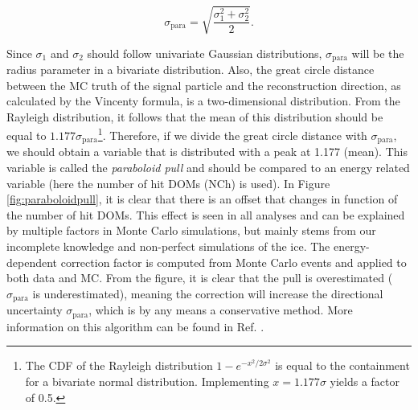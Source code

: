 \begin{equation}
\label{eq:paraboloid}
\sigma_\textrm{para} = \sqrt{\frac{\sigma_1^2 + \sigma_2^2}{2}}.
\end{equation}

\noindent Since $\sigma_1$ and $\sigma_2$ should follow univariate Gaussian distributions, $\sigma_\textrm{para}$ will be the radius parameter in a bivariate distribution. Also, the great circle distance between the MC truth of the signal particle and the reconstruction direction, as calculated by the Vincenty formula, is a two-dimensional distribution. From the Rayleigh distribution, it follows that the mean of this distribution should be equal to $1.177\sigma_\textrm{para}$\footnote{The CDF of the Rayleigh distribution $1-e^{-x^2/2\sigma^2}$ is equal to the containment for a bivariate normal distribution. Implementing $x=1.177\sigma$ yields a factor of 0.5.}. Therefore, if we divide the great circle distance with $\sigma_\textrm{para}$, we should obtain a variable that is distributed with a peak at 1.177 (mean). This variable is called the \textit{paraboloid pull} and should be compared to an energy related variable (here the number of hit DOMs (NCh) is used). In Figure \ref{fig:paraboloidpull}, it is clear that there is an offset that changes in function of the number of hit DOMs. This effect is seen in all analyses and can be explained by multiple factors in Monte Carlo simulations, but mainly stems from our incomplete knowledge and non-perfect simulations of the ice. The energy-dependent correction factor is computed from Monte Carlo events and applied to both data and MC. From the figure, it is clear that the pull is overestimated ($\sigma_\textrm{para}$ is underestimated), meaning the correction will increase the directional uncertainty $\sigma_\textrm{para}$, which is by any means a conservative method.
More information on this algorithm can be found in Ref. \cite{Neunhoffer:2004ha}.



